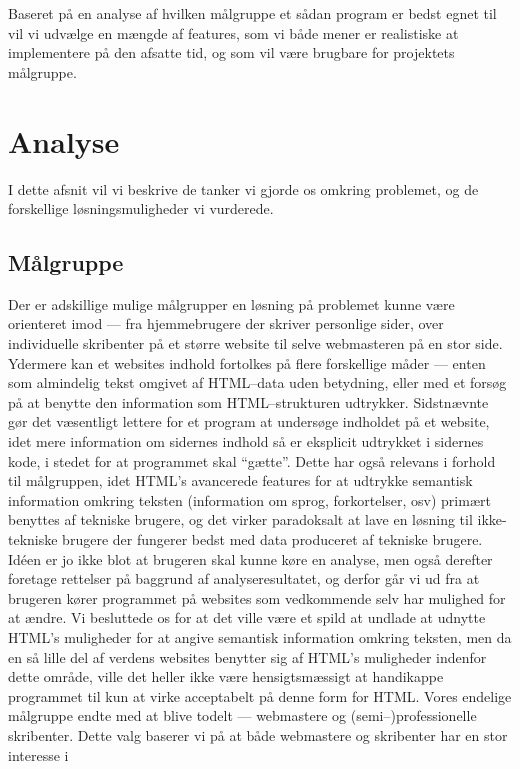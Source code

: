 \documentclass[a4paper,oneside]{memoir}
\begin{document}
Baseret på en analyse af hvilken målgruppe et sådan program er bedst
egnet til vil vi udvælge en mængde af features, som vi både mener er
realistiske at implementere på den afsatte tid, og som vil være
brugbare for projektets målgruppe.

\chapter{Analyse}
\label{analyse}
I dette afsnit vil vi beskrive de tanker vi gjorde os omkring
problemet, og de forskellige løsningsmuligheder vi vurderede.

\section{Målgruppe}
\label{målgruppe}
Der er adskillige mulige målgrupper en løsning på problemet kunne være
orienteret imod --- fra hjemmebrugere der skriver personlige sider,
over individuelle skribenter på et større website til selve
webmasteren på en stor side. Ydermere kan et websites indhold
fortolkes på flere forskellige måder --- enten som almindelig tekst
omgivet af HTML--data uden betydning, eller med et forsøg på at
benytte den information som HTML--strukturen udtrykker. Sidstnævnte
gør det væsentligt lettere for et program at undersøge indholdet på et
website, idet mere information om sidernes indhold så er eksplicit
udtrykket i sidernes kode, i stedet for at programmet skal
``gætte''. Dette har også relevans i forhold til målgruppen, idet
HTML's avancerede features for at udtrykke semantisk information
omkring teksten (information om sprog, forkortelser, osv) primært
benyttes af tekniske brugere, og det virker paradoksalt at lave en
løsning til ikke-tekniske brugere der fungerer bedst med data
produceret af tekniske brugere. Idéen er jo ikke blot at brugeren skal
kunne køre en analyse, men også derefter foretage rettelser på
baggrund af analyseresultatet, og derfor går vi ud fra at brugeren
kører programmet på websites som vedkommende selv har mulighed for at
ændre. Vi besluttede os for at det ville være et spild at undlade at
udnytte HTML's muligheder for at angive semantisk information omkring
teksten, men da en så lille del af verdens websites benytter sig af
HTML's muligheder indenfor dette område, ville det heller ikke være
hensigtsmæssigt at handikappe programmet til kun at virke acceptabelt
på denne form for HTML. Vores endelige målgruppe endte med at blive
todelt --- webmastere og (semi--)professionelle skribenter. Dette valg
baserer vi på at både webmastere og skribenter har en stor interesse i
\end{document}

